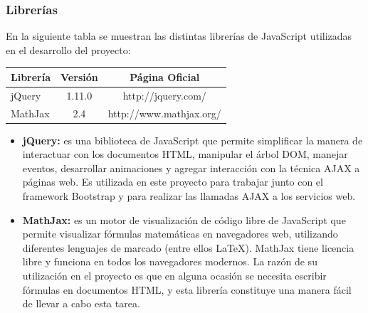 \subsubsection{\textbf{Librerías}}
En la siguiente tabla se muestran las distintas librerías de JavaScript utilizadas en el desarrollo del proyecto:

\begin{table}[H]
	\centering
	\begin{tabular}{|l|c|c|}
		\hline
		\textbf{Librería} & \textbf{Versión} & \textbf{Página Oficial} \\ \hline
		jQuery & 1.11.0 & http://jquery.com/ \\ \hline
		MathJax & 2.4 & http://www.mathjax.org/ \\ \hline
	\end{tabular}
\end{table}

\begin{itemize}
\item \textbf{jQuery:} es una biblioteca de JavaScript que permite simplificar la manera de interactuar con los documentos HTML, manipular el árbol DOM, manejar eventos, desarrollar animaciones y agregar interacción con la técnica AJAX a páginas web. Es utilizada en este proyecto para trabajar junto con el framework Bootstrap y para realizar las llamadas AJAX a los servicios web.
\item \textbf{MathJax:} es un motor de visualización de código libre de JavaScript que permite visualizar fórmulas matemáticas en navegadores web, utilizando diferentes lenguajes de marcado (entre ellos \LaTeX). MathJax tiene licencia libre y funciona en todos los navegadores modernos. La razón de su utilización en el proyecto es que en alguna ocasión se necesita escribir fórmulas en documentos HTML, y esta librería constituye una manera fácil de llevar a cabo esta tarea.
\end{itemize}
